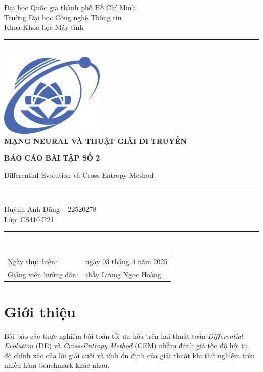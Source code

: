 \documentclass[10pt]{report}
\begin{document}
\begin{titlepage}
	\centering
	\vspace*{0.5cm}
	\LARGE{Đại học Quốc gia thành phố Hồ Chí Minh}\\[-0.2ex]
	\LARGE{Trường Đại học Công nghệ Thông tin}\\[2.5ex]
	\large{Khoa Khoa học Máy tính}\\
	\noindent\rule{\textwidth}{0.2pt}\\
	\vspace{2cm}
	\includegraphics[width=5cm]{assets/uit_logo.eps}\\
	\vspace{2cm}
	\textbf{\LARGE{MẠNG NEURAL VÀ THUẬT GIẢI DI TRUYỀN}}
	\medskip\par
	\textbf{\Large{BÁO CÁO BÀI TẬP SỐ 2}}
	\medskip\par
	\Large{Differential Evolution và Cross Entropy Method}\\[-1.5ex]
	\vspace{0.4cm}
	\noindent\rule{0.5\textwidth}{0.2pt}\\
	\vspace{0.4cm}
	\large{Huỳnh Anh Dũng -- 22520278}\\[-0.2ex]
	\large{Lớp: CS410.P21}\\[-0.2ex]
	\vspace{0.4cm}
	\noindent\rule{0.5\textwidth}{0.2pt}\\
	\vspace{1.6cm}
	\medskip
	\raggedright
	\begin{tabular}{ll}
		Ngày thực hiện:       & ngày 03 tháng 4 năm 2025 \\[-0.2ex]
		Giảng viên hướng dẫn: & thầy Lương Ngọc Hoàng    \\
	\end{tabular}
\end{titlepage}

\tableofcontents
\newpage

\chapter{Giới thiệu}
Bài báo cáo thực nghiệm bài toán tối ưu hóa trên hai thuật toán \emph{Differential Evolution} (DE) và \emph{Cross-Entropy Method} (CEM) nhằm đánh giá tốc độ hội tụ, độ chính xác của lời giải cuối và tính ổn định của giải thuật khi thử nghiệm trên nhiều hàm benchmark khác nhau.
\end{document}
